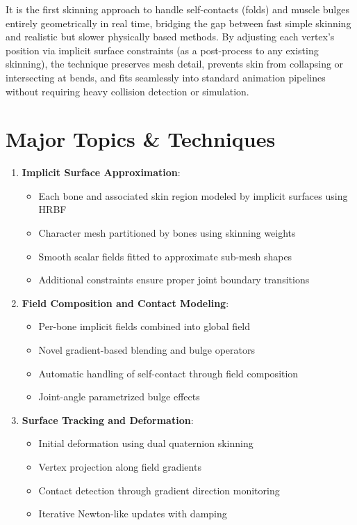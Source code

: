 \documentclass[12pt]{article}
\begin{document}
It is the first skinning approach to handle self-contacts (folds) and muscle bulges entirely geometrically in real time, bridging the gap between fast simple skinning and realistic but slower physically based methods. By adjusting each vertex's position via implicit surface constraints (as a post-process to any existing skinning), the technique preserves mesh detail, prevents skin from collapsing or intersecting at bends, and fits seamlessly into standard animation pipelines without requiring heavy collision detection or simulation.

\section{Major Topics \& Techniques}
\begin{enumerate}[noitemsep]
    \item \textbf{Implicit Surface Approximation}:
    \begin{itemize}[noitemsep]
        \item Each bone and associated skin region modeled by implicit surfaces using HRBF
        \item Character mesh partitioned by bones using skinning weights
        \item Smooth scalar fields fitted to approximate sub-mesh shapes
        \item Additional constraints ensure proper joint boundary transitions
    \end{itemize}
    
    \item \textbf{Field Composition and Contact Modeling}:
    \begin{itemize}[noitemsep]
        \item Per-bone implicit fields combined into global field
        \item Novel gradient-based blending and bulge operators
        \item Automatic handling of self-contact through field composition
        \item Joint-angle parametrized bulge effects
    \end{itemize}
    
    \item \textbf{Surface Tracking and Deformation}:
    \begin{itemize}[noitemsep]
        \item Initial deformation using dual quaternion skinning
        \item Vertex projection along field gradients
        \item Contact detection through gradient direction monitoring
        \item Iterative Newton-like updates with damping
    \end{itemize}
    

\end{enumerate}
\end{document}
